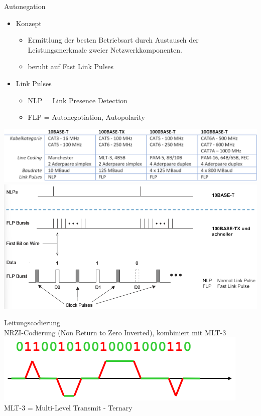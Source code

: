 \begin{concept}{Autonegation}
    \begin{itemize}
        \item Konzept
        \begin{itemize}
            \item Ermittlung der besten Betriebsart durch Austausch der Leistungsmerkmale zweier Netzwerkkomponenten.
            \item beruht auf Fast Link Pulses
        \end{itemize}
        \item Link Pulses
        \begin{itemize}
            \item NLP = Link Presence Detection
            \item FLP = Autonegotiation, Autopolarity
        \end{itemize}
    \end{itemize}
        \includegraphics[width=1\linewidth]{images/ethernet_systeme.png}\\
        \includegraphics[width=1\linewidth]{images/autonegation.png}
\end{concept}

\begin{concept}{Leitungscodierung}\\
    NRZI-Codierung (Non Return to Zero Inverted), kombiniert mit MLT-3\\
        \includegraphics[width=0.5\linewidth]{images/leitungscodierung.png}\\
    MLT-3 = Multi-Level Transmit - Ternary
\end{concept}

